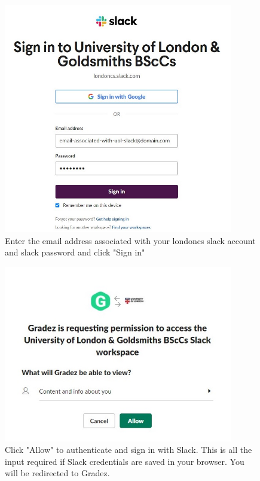 \begin{figure}[H]
    \centering
    \includegraphics[width=10cm]{images/user-guide/slack-sign-in/3.jpg}
    \caption{Enter the email address associated with your londoncs slack account and slack password and click "Sign in"}
    \label{fig:slacksignin3}
\end{figure}
\begin{figure}[H]
    \centering
    \includegraphics[width=10cm]{images/user-guide/slack-sign-in/4.jpg}
    \caption{Click "Allow" to authenticate and sign in with Slack. This is all the input required if Slack credentials are saved in your browser. You will be redirected to Gradez.}
    \label{fig:slacksignin4}
\end{figure}
